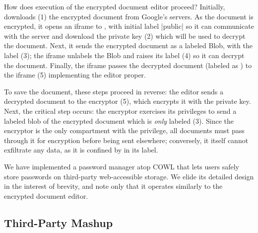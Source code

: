 How does execution of the encrypted document editor proceed?
%
Initially,  downloads (1) the encrypted document from
Google's servers.
%
As the document is encrypted, it opens an iframe to
, with initial label 
\js|public| so it can communicate with the  server and
download the private key (2) which will be used to decrypt the document.
%
Next, it sends the encrypted document as a labeled Blob, with the label
 (3); the iframe unlabels the Blob and
raises its label (4) so it can decrypt the document.
%
Finally, the iframe passes the decrypted document (labeled as
) to the iframe (5) 
implementing the editor proper.

To save the document, these steps proceed in reverse: the editor sends
a decrypted document to the encryptor (5), which encrypts it with the
private key.  Next, the critical step occurs: the encryptor exercises
its privileges to send a labeled blob of the encrypted document which
is \emph{only} labeled  (3).  Since the
encryptor is the only compartment with the  privilege,
all documents must pass through it for encryption before being sent
elsewhere; conversely, it itself cannot exfiltrate any data, as it is
confined by  in its label.


We have implemented a password manager atop COWL that lets users
safely store passwords on third-party web-accessible storage. We elide
its detailed design in the interest of brevity, and note only that it
operates similarly to the encrypted document editor.

\subsection{Third-Party Mashup}
\label{sec:apps-mashup}


